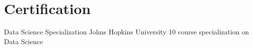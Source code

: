 \section{Certification}
  \resumeSubHeadingListStart
    \resumeSubheading
      {Data Science Specialization \href{https://github.com/benthecoder/JohnHopkinsDataScience}{}}{Johns Hopkins University}
      {10 course specialization on Data Science}{} 
      \resumeItemListStart
    \resumeItemListEnd
  \resumeSubHeadingListEnd